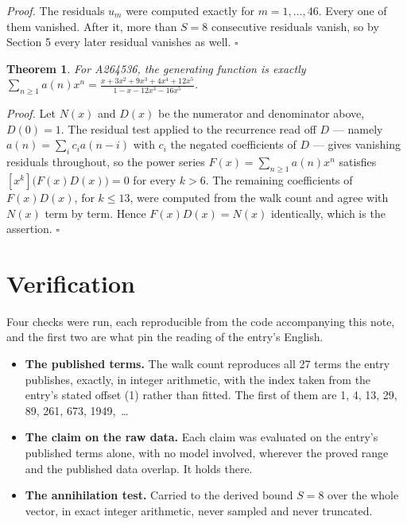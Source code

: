 \documentclass[11pt]{article}
\newtheorem{theorem}{Theorem}
\theoremstyle{definition}
\begin{document}
{\itshape Proof.} The residuals $u_m$ were computed exactly for $m = 1,\dots,46$. Every one of them vanished. After it, more than $S = 8$ consecutive residuals vanish, so by Section 5 every later residual vanishes as well. $\square$

\begin{theorem} For A264536, the generating function is exactly $\sum_{n\ge 1} a(n)x^n = \frac{x + 3x^{2} + 9x^{3} + 4x^{4} + 12x^{5}}{1 - x - 12x^{3} - 16x^{5}}$.\end{theorem}

{\itshape Proof.} Let $N(x)$ and $D(x)$ be the numerator and denominator above, $D(0)=1$. The residual test applied to the recurrence read off $D$ --- namely $a(n) = \sum_i c_i a(n-i)$ with $c_i$ the negated coefficients of $D$ --- gives vanishing residuals throughout, so the power series $F(x)=\sum_{n\ge 1}a(n)x^n$ satisfies $[x^k]\bigl(F(x)D(x)\bigr) = 0$ for every $k > 6$. The remaining coefficients of $F(x)D(x)$, for $k \le 13$, were computed from the walk count and agree with $N(x)$ term by term. Hence $F(x)D(x) = N(x)$ identically, which is the assertion. $\square$

\section{Verification}

Four checks were run, each reproducible from the code accompanying this note, and the first two are what pin the reading of the entry's English.

\begin{itemize}

\item {\bfseries The published terms.} The walk count reproduces all 27 terms the entry publishes, exactly, in integer arithmetic, with the index taken from the entry's stated offset (1) rather than fitted. The first of them are 1, 4, 13, 29, 89, 261, 673, 1949,~\dots

\item {\bfseries The claim on the raw data.} Each claim was evaluated on the entry's published terms alone, with no model involved, wherever the proved range and the published data overlap. It holds there.

\item {\bfseries The annihilation test.} Carried to the derived bound $S = 8$ over the whole vector, in exact integer arithmetic, never sampled and never truncated.

\end{itemize}
\end{document}
